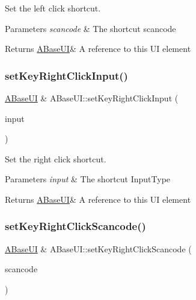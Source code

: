 Set the left click shortcut. 


\begin{DoxyParams}{Parameters}
{\em scancode} & The shortcut scancode \\
\hline
\end{DoxyParams}
\begin{DoxyReturn}{Returns}
\hyperlink{class_a_base_u_i}{A\+Base\+UI}\& A reference to this UI element 
\end{DoxyReturn}
\mbox{\label{class_a_base_u_i_a28c110e7ad0f77043d5348035bd39f7a}} 
\subsubsection{\texorpdfstring{set\+Key\+Right\+Click\+Input()}{setKeyRightClickInput()}}
{\footnotesize\ttfamily \hyperlink{class_a_base_u_i}{A\+Base\+UI} \& A\+Base\+U\+I\+::set\+Key\+Right\+Click\+Input (\begin{DoxyParamCaption}\item[{Input\+Type\+::\+Enum}]{input }\end{DoxyParamCaption})\hspace{0.3cm}{\ttfamily [virtual]}}



Set the right click shortcut. 


\begin{DoxyParams}{Parameters}
{\em input} & The shortcut Input\+Type \\
\hline
\end{DoxyParams}
\begin{DoxyReturn}{Returns}
\hyperlink{class_a_base_u_i}{A\+Base\+UI}\& A reference to this UI element 
\end{DoxyReturn}
\mbox{\label{class_a_base_u_i_a2929b4cb63c16464efa957038d523c02}} 
\subsubsection{\texorpdfstring{set\+Key\+Right\+Click\+Scancode()}{setKeyRightClickScancode()}}
{\footnotesize\ttfamily \hyperlink{class_a_base_u_i}{A\+Base\+UI} \& A\+Base\+U\+I\+::set\+Key\+Right\+Click\+Scancode (\begin{DoxyParamCaption}\item[{S\+D\+L\+\_\+\+Scancode}]{scancode }\end{DoxyParamCaption})\hspace{0.3cm}{\ttfamily [virtual]}}



